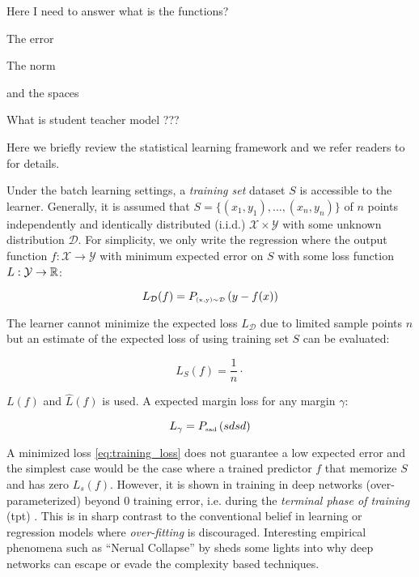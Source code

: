 Here I need to answer what is the functions?

The error

The norm

and the spaces

What is student teacher model ???

Here we briefly review the statistical learning framework and we refer readers to \cite{shalev-shwartzUnderstandingMachineLearning2014a} for details.

Under the batch learning settings, a \textit{training set} dataset $S$ is
accessible to the learner. Generally, it is assumed that $S = \{(x_1,y_1),
\dots, (x_n, y_n)\}$ of $n$ points independently and identically distributed
(i.i.d.) $\mathcal{X} \times \mathcal{Y}$ with some unknown distribution
$\mathcal{D}$. For simplicity, we only write the regression where the output
function $f: \mathcal{X} \to \mathcal{Y}$ with minimum expected error on $S$
with some loss function $L: \mathcal{Y} \to \mathbb{R}$:

\begin{equation}
    \label{eq:training_loss}
    L_{\mathcal{D}}(f) = \PRi{(x, y) \sim \mathcal{D}}{y - f(x)}
\end{equation}

The learner cannot minimize the expected loss $L_{\mathcal{D}}$ due to limited
sample points $n$ but an estimate of the expected loss of using training set $S$
can be evaluated:

\begin{equation}
    L_{S}(f) = \frac{1}{n} \cdot
\end{equation}

$L(f)$ and $\hat{L}(f)$ is used. A expected margin loss for any margin $\gamma$:

\begin{equation}
    L_{\gamma} = \PRi{sad}{sdsd}
\end{equation}


A minimized loss \eqref{eq:training_loss} does not guarantee a low expected
error and the simplest case would be the case where a trained predictor $f$ that
memorize $S$ and has zero $L_{s}(f)$. However, it is shown in  training in deep networks (over-parameterized) beyond $0$ training
error, i.e. during the \textit{terminal phase of training} (\Gls{tpt}) \TOCITE.
This is in sharp contrast to the conventional belief in learning or regression
models where \textit{over-fitting} is discouraged. Interesting empirical
phenomena such as ``Nerual Collapse'' by \TOCITE sheds some lights into why deep
networks can escape or evade the complexity based techniques.

